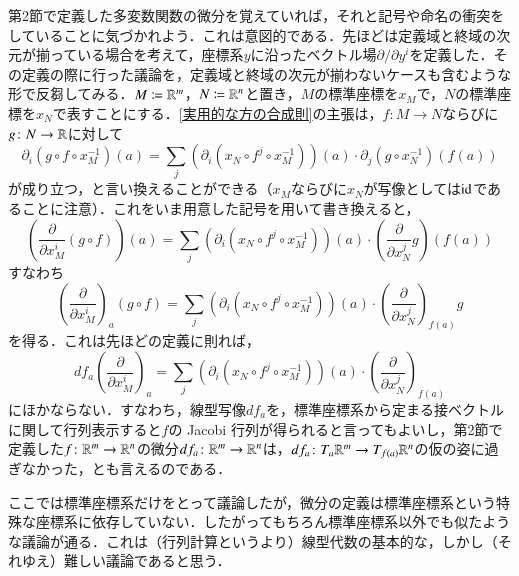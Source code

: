 第2節で定義した多変数関数の微分を覚えていれば，それと記号や命名の衝突をしていることに気づかれよう．これは意図的である．先ほどは定義域と終域の次元が揃っている場合を考えて，座標系$y$に沿ったベクトル場$\partial / \partial y^i$を定義した．その定義の際に行った議論を，定義域と終域の次元が揃わないケースも含むような形で反芻してみる．$M \coloneqq \mathbb{R}^m$，$N \coloneqq \mathbb{R}^n$と置き，$M$の標準座標を$x_M$で，$N$の標準座標を$x_N$で表すことにする．\cref{実用的な方の合成則}の主張は，$f \colon M \to N$ならびに$g \colon N \to \mathbb{R}$に対して
\begin{equation}
\partial_i (g \circ f \circ x_M^{-1}) (a) = \sum_{j} \left( \partial_i (x_N \circ f^j \circ x_M^{-1}) \right) (a) \cdot \partial_j (g \circ x_N^{-1}) (f(a))
\end{equation}が成り立つ，と言い換えることができる（$x_M$ならびに$x_N$が写像としては$\operatorname{id}$であることに注意）．これをいま用意した記号を用いて書き換えると，
\begin{equation}
\left( \frac{\partial}{\partial x^i_M} (g \circ f) \right) (a) = \sum_{j} \left( \partial_i (x_N \circ f^j \circ x_M^{-1}) \right) (a) \cdot \left(\frac{\partial}{\partial x_N^j} g\right) (f(a))
\end{equation}
すなわち
\begin{equation}
\left( \frac{\partial}{\partial x^i_M} \right)_a (g \circ f) = \sum_{j} \left( \partial_i (x_N \circ f^j \circ x_M^{-1}) \right) (a) \cdot \left(\frac{\partial}{\partial x_N^j}\right)_{f(a)} g
\end{equation}
を得る．これは先ほどの定義に則れば，
\begin{equation}
df_a \left( \frac{\partial}{\partial x^i_M} \right)_a = \sum_{j} \left( \partial_i (x_N \circ f^j \circ x_M^{-1}) \right) (a) \cdot \left(\frac{\partial}{\partial x_N^j}\right)_{f(a)}
\end{equation}にほかならない．すなわち，線型写像$df_a$を，標準座標系から定まる接ベクトルに関して行列表示すると$f$の Jacobi 行列が得られると言ってもよいし，第2節で定義した$f \colon \mathbb{R}^m \to \mathbb{R}^n$の微分$df_a \colon \mathbb{R}^m \to \mathbb{R}^n$は，$df_a \colon T_a\mathbb{R}^m \to T_{f(a)}\mathbb{R}^n$の仮の姿に過ぎなかった，とも言えるのである．

\begin{que}
ここでは標準座標系だけをとって議論したが，微分の定義は標準座標系という特殊な座標系に依存していない．したがってもちろん標準座標系以外でも似たような議論が通る．これは（行列計算というより）線型代数の基本的な，しかし（それゆえ）難しい議論であると思う．
\end{que}

